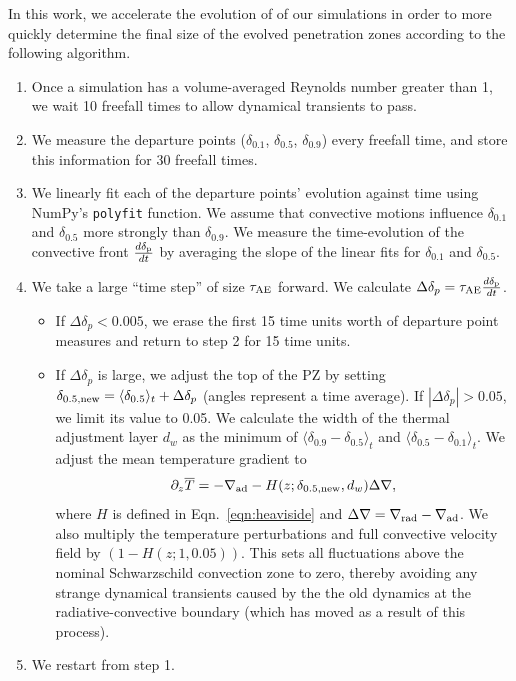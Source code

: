 \documentclass{aastex631}
\newcommand{\gradrad}{\ensuremath{\nabla_{\rm{rad}}}}
\newcommand{\gradad}{\ensuremath{\nabla_{\rm{ad}}}}
\newcommand{\justgrad}{\ensuremath{\nabla}}
\newcommand{\delp}{\ensuremath{\delta_{\rm{p}}}}
\newcommand{\angles}[1]{\langle #1 \rangle}
\begin{document}
In this work, we accelerate the evolution of of our simulations in order to more quickly determine the final size of the evolved penetration zones according to the following algorithm.
\begin{enumerate}
\item Once a simulation has a volume-averaged Reynolds number greater than 1, we wait 10 freefall times to allow dynamical transients to pass.
\item We measure the departure points ($\delta_{0.1}$, $\delta_{0.5}$, $\delta_{0.9}$) every freefall time, and store this information for 30 freefall times.
\item We linearly fit each of the departure points' evolution against time using NumPy's \texttt{polyfit} function.
We assume that convective motions influence $\delta_{0.1}$ and $\delta_{0.5}$ more strongly than $\delta_{0.9}$.
We measure the time-evolution of the convective front $\frac{d \delp}{dt}$ by averaging the slope of the linear fits for $\delta_{0.1}$ and $\delta_{0.5}$.
\item We take a large ``time step'' of size $\tau_{\rm{AE}}$ forward.
We calculate $\Delta \delta_p = \tau_{\rm{AE}} \frac{d \delp}{dt}$.
\begin{itemize}
\item If $\Delta \delta_p < 0.005$, we erase the first 15 time units worth of departure point measures and return to step 2 for 15 time units.
\item  If $\Delta \delta_p$ is large, we adjust the top of the PZ by setting $\delta_{0.5,\rm{new}} = \angles{\delta_{0.5}}_t + \Delta \delta_p$ (angles represent a time average).
If $|\Delta \delta_p| > 0.05$, we limit its value to 0.05.
We calculate the width of the thermal adjustment layer $d_w$ as the minimum of $\angles{\delta_{0.9} - \delta_{0.5}}_t$ and $\angles{\delta_{0.5} - \delta_{0.1}}_t$.
We adjust the mean temperature gradient to
\begin{equation}
\partial_z \overline{T} = -\gradad - H(z; \delta_{\rm{0.5,\rm{new}}}, d_w) \Delta\justgrad,
\label{eqn:initial_grad}
\end{equation}
where $H$ is defined in Eqn.~\ref{eqn:heaviside} and $\Delta\justgrad = \gradrad - \gradad$.
We also multiply the temperature perturbations and full convective velocity field by $(1 - H(z; 1, 0.05))$.
This sets all fluctuations above the nominal Schwarzschild convection zone to zero, thereby avoiding any strange dynamical transients caused by the the old dynamics at the radiative-convective boundary (which has moved as a result of this process).
\end{itemize}
\item We restart from step 1.
\end{enumerate}
\end{document}
